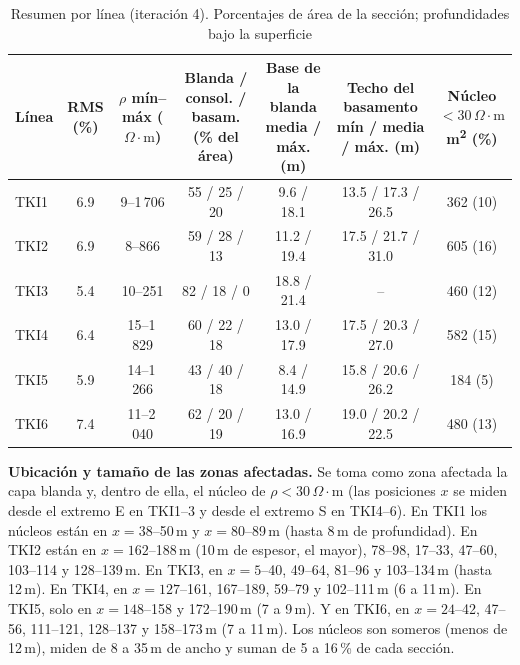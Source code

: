 \documentclass[conference]{IEEEtran}
\newcommand{\ohmm}{\ensuremath{\Omega\!\cdot\!\mathrm{m}}}
\begin{document}
\begin{table}[!t]
\caption{Resumen por línea (iteración 4). Porcentajes de área de la sección; profundidades bajo la superficie}
\label{tab:zonas}
\centering
\small
\begin{tabular}{@{}lcccccc@{}}
\toprule
Línea & \thead{RMS\\(\%)} & \thead{$\rho$ mín--máx\\(\ohmm)} & \thead{Blanda / consol. / basam.\\(\% del área)} & \thead{Base de la blanda\\media / máx. (m)} & \thead{Techo del basamento\\mín / media / máx. (m)} & \thead{Núcleo $<30$\,\ohmm\\m\textsuperscript{2} (\%)} \\
\midrule
TKI1 & 6.9 & 9--1\,706 & 55 / 25 / 20 & 9.6 / 18.1 & 13.5 / 17.3 / 26.5 & 362 (10) \\
TKI2 & 6.9 & 8--866 & 59 / 28 / 13 & 11.2 / 19.4 & 17.5 / 21.7 / 31.0 & 605 (16) \\
TKI3 & 5.4 & 10--251 & 82 / 18 / 0 & 18.8 / 21.4 & -- & 460 (12) \\
TKI4 & 6.4 & 15--1\,829 & 60 / 22 / 18 & 13.0 / 17.9 & 17.5 / 20.3 / 27.0 & 582 (15) \\
TKI5 & 5.9 & 14--1\,266 & 43 / 40 / 18 & 8.4 / 14.9 & 15.8 / 20.6 / 26.2 & 184 (5) \\
TKI6 & 7.4 & 11--2\,040 & 62 / 20 / 19 & 13.0 / 16.9 & 19.0 / 20.2 / 22.5 & 480 (13) \\
\bottomrule
\end{tabular}
\end{table}

\textbf{Ubicación y tamaño de las zonas afectadas.} Se toma como zona afectada la capa blanda y, dentro de ella, el núcleo de $\rho<30$\,\ohmm{} (las posiciones $x$ se miden desde el extremo E en TKI1--3 y desde el extremo S en TKI4--6). En TKI1 los núcleos están en $x=38$--50\,m y $x=80$--89\,m (hasta 8\,m de profundidad). En TKI2 están en $x=162$--188\,m (10\,m de espesor, el mayor), 78--98, 17--33, 47--60, 103--114 y 128--139\,m. En TKI3, en $x=5$--40, 49--64, 81--96 y 103--134\,m (hasta 12\,m). En TKI4, en $x=127$--161, 167--189, 59--79 y 102--111\,m (6 a 11\,m). En TKI5, solo en $x=148$--158 y 172--190\,m (7 a 9\,m). Y en TKI6, en $x=24$--42, 47--56, 111--121, 128--137 y 158--173\,m (7 a 11\,m). Los núcleos son someros (menos de 12\,m), miden de 8 a 35\,m de ancho y suman de 5 a 16\,\% de cada sección.
\end{document}
